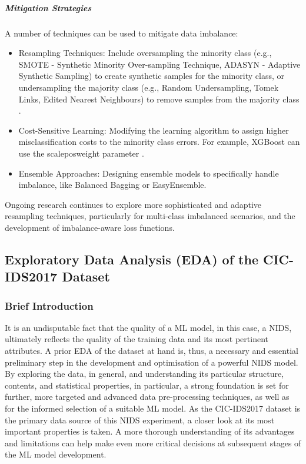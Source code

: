 \subparagraph{Mitigation Strategies} 
A number of techniques can be used to mitigate data imbalance:
\begin{itemize}[noitemsep] 
\item Resampling Techniques: Include oversampling the minority class (e.g., SMOTE - Synthetic Minority Over-sampling Technique, ADASYN - Adaptive Synthetic Sampling) to create synthetic samples for the minority class, or undersampling the majority class (e.g., Random Undersampling, Tomek Links, Edited Nearest Neighbours) to remove samples from the majority class \parencite {mahfouz2022systematic}.
\item Cost-Sensitive Learning: Modifying the learning algorithm to assign higher misclassification costs to the minority class errors. For example, XGBoost can use the scale\textunderscore pos\textunderscore weight parameter \parencite {habeeb2024two}.
\item Ensemble Approaches: Designing ensemble models to specifically handle imbalance, like Balanced Bagging or EasyEnsemble.
\end{itemize} 
Ongoing research continues to explore more sophisticated and adaptive resampling techniques, particularly for multi-class imbalanced scenarios, and the development of imbalance-aware loss functions.



\subsection{Exploratory Data Analysis (EDA) of the CIC-IDS2017 Dataset} 

\subsubsection{Brief Introduction} 
It is an undisputable fact that the quality of a ML model, in this case, a NIDS, ultimately reflects the quality of the training data and its most pertinent attributes. A prior EDA of the dataset at hand is, thus, a necessary and essential preliminary step in the development and optimisation of a powerful NIDS model. By exploring the data, in general, and understanding its particular structure, contents, and statistical properties, in particular, a strong foundation is set for further, more targeted and advanced data pre-processing techniques, as well as for the informed selection of a suitable ML model. As the CIC-IDS2017 dataset is the primary data source of this NIDS experiment, a closer look at its most important properties is taken. A more thorough understanding of its advantages and limitations can help make even more critical decisions at subsequent stages of the ML model development.

